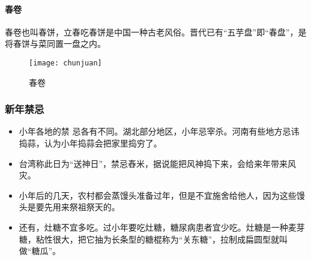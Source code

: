 \paragraph{春卷}
春卷也叫春饼，立春吃春饼是中国一种古老风俗。晋代已有“五芋盘”即“春盘”，是将春饼与菜同置一盘之内。
\begin{figure}[htb]
    \centering
    \texttt{[image: chunjuan]}
    \caption{春卷}
\end{figure}
\subsubsection{新年禁忌}
\begin{itemize}
\item 
小年各地的禁 忌各有不同。湖北部分地区，小年忌宰杀。河南有些地方忌讳捣蒜，认为小年捣蒜会把家里捣穷了。
\item
台湾称此日为“送神日”，禁忌舂米，据说能把风神捣下来，会给来年带来风灾。
\item 
小年后的几天，农村都会蒸馒头准备过年，但是不宜施舍给他人，因为这些馒头是要先用来祭祖祭天的。
\item 
还有，灶糖不宜多吃。过小年要吃灶糖，糖尿病患者宜少吃。灶糖是一种麦芽糖，粘性很大，把它抽为长条型的糖棍称为“关东糖”，拉制成扁圆型就叫做“糖瓜”。
\end{itemize}